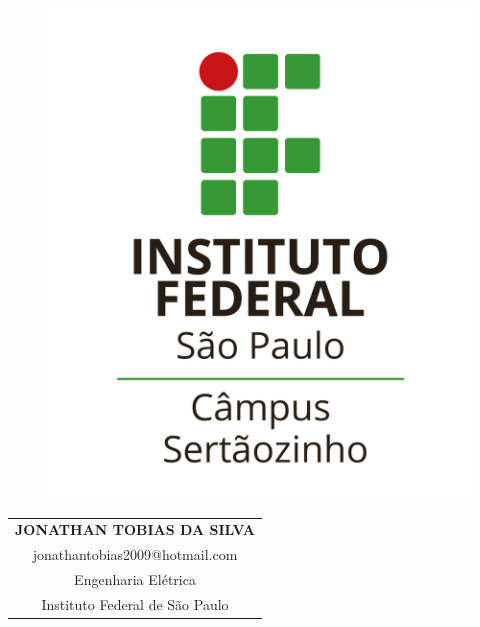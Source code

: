 \documentclass[../Main.tex]{subfiles}
\begin{document}
    \begin{minipage}{0.23\linewidth}
    	\begin{figure}[H]
    		\includegraphics[scale=0.30]{Images/logo-ifsp}
    	\end{figure}
    \end{minipage}
    \begin{minipage}{0.39\linewidth}
    	\begin{table}[H]
    	\def\arraystretch{1} %
    		\begin{tabular}{c}
    			\textbf{JONATHAN TOBIAS DA SILVA} \\
    			jonathantobias2009@hotmail.com \\
    			Engenharia Elétrica \\
    			Instituto Federal de São Paulo
    		\end{tabular}
    	\end{table}
    \end{minipage}
\end{document}
